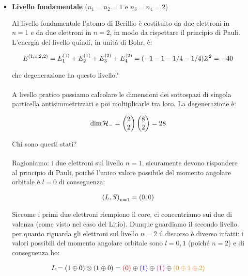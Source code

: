 \begin{itemize}
	\item \textbf{Livello fondamentale} ($n_1 = n_2 = 1$ e $n_3 = n_4 = 2$)
	
		Al livello fondamentale l'atomo di Berillio è costituito da due elettroni in $n = 1$ e da due elettroni in $n = 2$, in modo da rispettare il principio di Pauli. L'energia del livello quindi, in unità di Bohr, è:

\begin{align*}
	E^{\qty(1, 1, 2, 2)} = E_1^{\qty(1)} + E_2^{\qty(1)} + E_3^{\qty(2)} + E_4^{\qty(2)} = \qty(-1-1-1/4-1/4) Z^2 = -40
\end{align*}
	
		che degenerazione ha questo livello? 
		\\
		\\
		A livello pratico possiamo calcolare le dimensioni dei sottospazi di singola particella antisimmetrizzati e poi moltiplicarle tra loro. La degenerazione è:
		
	\begin{align*}
		\text{dim} \, \mathcal{H}_- = \mqty(2 \\ 2) \, \mqty(8 \\ 2 ) = 28
	\end{align*}
	
		Chi sono questi stati?
		\\
		\\
		Ragioniamo: i due elettroni sul livello $n = 1$, sicuramente devono rispondere al principio di Pauli, poiché l'unico valore possibile del momento angolare orbitale è $l = 0$ di conseguenza:
		
	\begin{align*}
		\qty(L, S)_{n = 1} = \qty(0, 0)
	\end{align*}

		Siccome i primi due elettroni riempiono il core, ci concentriamo sui due di valenza (come visto nel caso del Litio). Dunque guardiamo il secondo livello. per quanto riguarda gli elettroni sul livello $n = 2$ il discorso è diverso infatti: i valori possibili del momento angolare orbitale sono $l = 0, 1$ (poiché $n = 2$) e di conseguenza ho:
		
	\begin{align*}
		L = \qty(1 \oplus 0) \otimes \qty(1 \oplus 0) = \textcolor{red}{(0)} \oplus \textcolor{blue}{(1)} \oplus \textcolor{magenta}{(1)} \oplus \textcolor{orange}{\qty( 0 \oplus 1 \oplus 2)}
	\end{align*}


\end{itemize}
